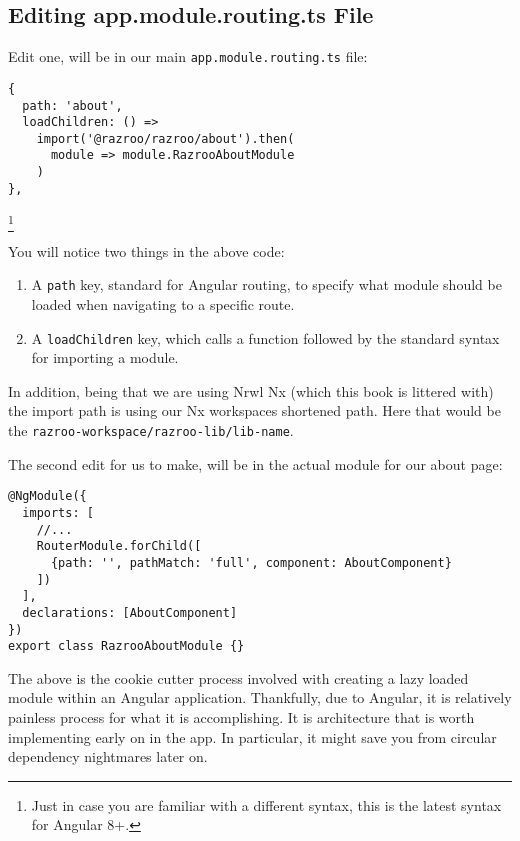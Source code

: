 \subsection{Editing app.module.routing.ts File}
Edit one, will be in our main \lstinline{app.module.routing.ts} file:
\begin{lstlisting}
{
  path: 'about',
  loadChildren: () =>  
    import('@razroo/razroo/about').then(
      module => module.RazrooAboutModule
    )
},
\end{lstlisting}
\footnote{Just in case you are familiar with a different syntax, this is the 
latest syntax for Angular 8+.}

You will notice two things in the above code: 
\begin{enumerate}
  \item A \lstinline{path} key, standard for Angular routing, to specify what 
  module should be loaded when navigating to a specific route. 
  \item A \lstinline{loadChildren} key, which calls a function followed by the 
  standard syntax for importing a module. 
\end{enumerate}

In addition, being that we are using Nrwl Nx (which this book is littered with)
the import path is using our Nx workspaces shortened path. Here that would be the 
\lstinline{razroo-workspace/razroo-lib/lib-name}.

The second edit for us to make, will be in the actual module for our about page: 
\begin{lstlisting}
@NgModule({
  imports: [
    //...
    RouterModule.forChild([
      {path: '', pathMatch: 'full', component: AboutComponent}
    ])
  ],
  declarations: [AboutComponent]
})
export class RazrooAboutModule {}
\end{lstlisting}


The above is the cookie cutter process involved with creating a lazy loaded module 
within an Angular application. Thankfully, due to Angular, it is relatively painless 
process for what it is accomplishing. It is architecture that is worth implementing
early on in the app. In particular, it might save you from circular dependency 
nightmares later on. 